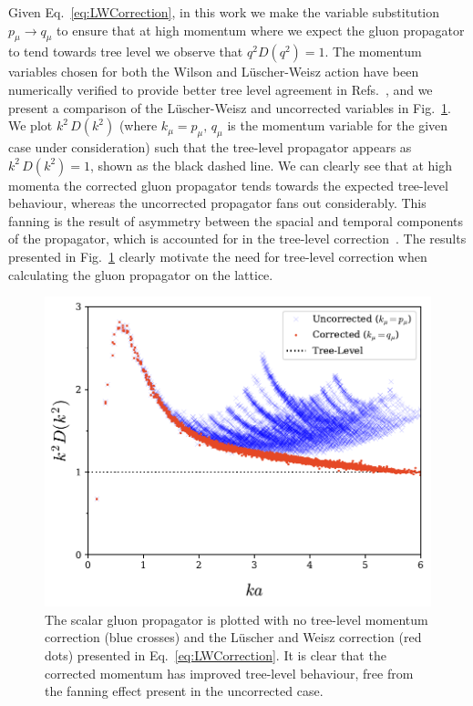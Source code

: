Given Eq.~\ref{eq:LWCorrection}, in this work we make the variable substitution $p_\mu\rightarrow q_\mu$ to ensure that at high momentum where we expect the gluon propagator to tend towards tree level we observe that $q^2 D(q^2) = 1$. The momentum variables chosen for both the Wilson and L\"uscher-Weisz action have been numerically verified to provide better tree level agreement in Refs.~\cite{Marenzoni:1994ap, Bonnet:2001uh}, and we present a comparison of the L\"uscher-Weisz and uncorrected variables in Fig.~\ref{fig:MomentumComparison}. We plot $k^2\,D(k^2)$ (where $k_\mu=p_\mu,\,q_\mu$ is the momentum variable for the given case under consideration) such that the tree-level propagator appears as $k^2\,D(k^2)=1$, shown as the black dashed line. We can clearly see that at high momenta the corrected gluon propagator tends towards the expected tree-level behaviour, whereas the uncorrected propagator fans out considerably. This fanning is the result of asymmetry between the spacial and temporal components of the propagator, which is accounted for in the tree-level correction~\cite{Marenzoni:1994ap}. The results presented in Fig.~\ref{fig:MomentumComparison} clearly motivate the need for tree-level correction when calculating the gluon propagator on the lattice.\\
%
\begin{figure}[htb!]
\centering
\includegraphics[width=\linewidth]{./ScalarGluComp_q2_MomentumComparison.pdf}
\caption[The scalar gluon propagator is plotted with no tree-level momentum correction and the L\"uscher and Weisz correction.]{\label{fig:MomentumComparison} The scalar gluon propagator is plotted with no tree-level momentum correction (blue crosses) and the L\"uscher and Weisz correction (red dots) presented in Eq.~\ref{eq:LWCorrection}. It is clear that the corrected momentum has improved tree-level behaviour, free from the fanning effect present in the uncorrected case.}
\end{figure}
%
